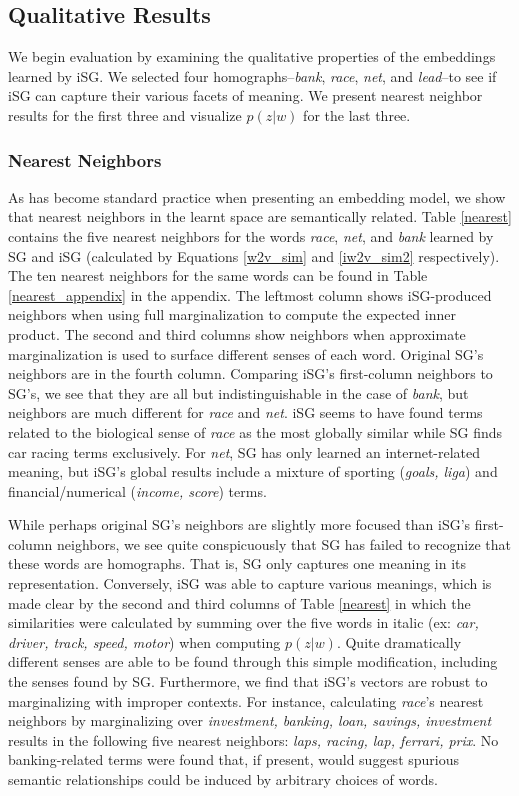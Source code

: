 \documentclass{article} %
\begin{document}
\subsection{Qualitative Results}\label{qual_results}
We begin evaluation by examining the qualitative properties of the embeddings learned by iSG.  We selected four homographs--\textit{bank}, \textit{race}, \textit{net}, and \textit{lead}--to see if iSG can capture their various facets of meaning.  We present nearest neighbor results for the first three and visualize $p(z|w)$ for the last three.  
\subsubsection{Nearest Neighbors}
As has become standard practice when presenting an embedding model, we show that nearest neighbors in the learnt space are semantically related.  Table \ref{nearest} contains the five nearest neighbors for the words \textit{race}, \textit{net}, and \textit{bank} learned by SG and iSG (calculated by Equations \ref{w2v_sim} and \ref{iw2v_sim2} respectively).  The ten nearest neighbors for the same words can be found in Table \ref{nearest_appendix} in the appendix.  The leftmost column shows iSG-produced neighbors when using full marginalization to compute the expected inner product.  The second and third columns show neighbors when approximate marginalization is used to surface different senses of each word.  Original SG's neighbors are in the fourth column.  Comparing iSG's first-column neighbors to SG's, we see that they are all but indistinguishable in the case of \textit{bank}, but neighbors are much different for \textit{race} and \textit{net}.  iSG seems to have found terms related to the biological sense of \textit{race} as the most globally similar while SG finds car racing terms exclusively.  For \textit{net}, SG has only learned an internet-related meaning, but iSG's global results include a mixture of sporting (\textit{goals, liga}) and financial/numerical (\textit{income, score}) terms.  

While perhaps original SG's neighbors are slightly more focused than iSG's first-column neighbors, we see quite conspicuously that SG has failed to recognize that these words are homographs.  That is, SG only captures one meaning in its representation.  Conversely, iSG was able to capture various meanings, which is made clear by the second and third columns of Table \ref{nearest} in which the similarities were calculated by summing over the five words in italic (ex: \textit{car, driver, track, speed, motor}) when computing $p(z|w)$.  Quite dramatically different senses are able to be found through this simple modification, including the senses found by SG.  Furthermore, we find that iSG's vectors are robust to marginalizing with improper contexts.  For instance, calculating \textit{race}'s nearest neighbors by marginalizing over \textit{investment, banking, loan, savings, investment} results in the following five nearest neighbors: \textit{laps, racing, lap, ferrari, prix}.  No banking-related terms were found that, if present, would suggest spurious semantic relationships could be induced by arbitrary choices of words.  
\end{document}
